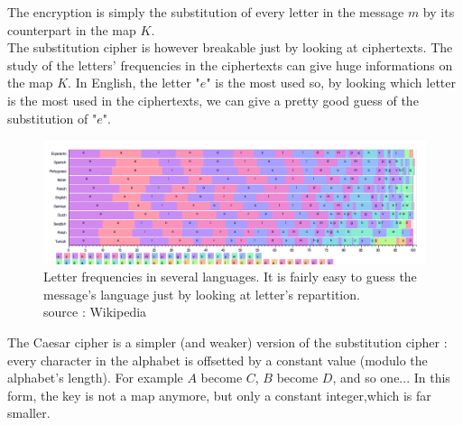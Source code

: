 \begin{table}[h!]
    \centering
	\caption{Exemple of a encryption using the substitution procedure}
	\label{tab:ExempleSubstitutionEncryption}
\end{table}


The encryption is simply the substitution of every letter in the message $m$ by its counterpart in the map $K$.\\
The substitution cipher is however breakable just by looking at ciphertexts. The study of the letters' frequencies in the ciphertexts can give huge informations on the map $K$. In English, the letter "$e$" is the most used so, by looking which letter is the most used in the ciphertexts, we can give a pretty good guess of the substitution of "$e$".\\

\begin{figure}[ht!]
    \centering
		\includegraphics[width=\textwidth]{images/letter_frequency}
	\caption{Letter frequencies in several languages. It is fairly easy to guess the message's language just by looking at letter's repartition. \\ source : Wikipedia}
	\label{fig:LetterFrequency}
\end{figure}

The Caesar cipher is a simpler (and weaker) version of the substitution cipher : every character in the alphabet is offsetted by a constant value (modulo the alphabet's length). For example $A$ become $C$, $B$ become $D$, and so one... In this form, the key is not a map anymore, but only a constant integer,which is far smaller. 

%    


